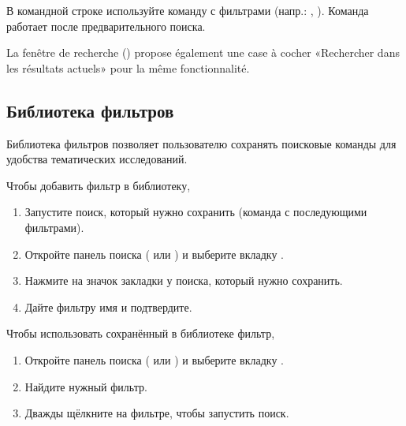 \documentclass[letterpaper,10pt,russian]{sphinxmanual}
\begin{document}
\sphinxAtStartPar
В командной строке используйте команду  с фильтрами (напр.: , ). Команда  работает после предварительного поиска.

\sphinxAtStartPar
La fenêtre de recherche () propose également une case à cocher
«Rechercher dans les résultats actuels» pour la même fonctionnalité.


\subsection{Библиотека фильтров}
\label{\detokenize{annexe_filtres:bibliotheque-de-filtres}}
\sphinxAtStartPar
Библиотека фильтров позволяет пользователю сохранять поисковые команды для удобства тематических исследований.

\sphinxAtStartPar
Чтобы добавить фильтр в библиотеку,
\begin{enumerate}
%
\item {} 
\sphinxAtStartPar
Запустите поиск, который нужно сохранить (команда  с последующими фильтрами).

\item {} 
\sphinxAtStartPar
Откройте панель поиска ( или ) и выберите вкладку .

\item {} 
\sphinxAtStartPar
Нажмите на значок закладки у поиска, который нужно сохранить.

\item {} 
\sphinxAtStartPar
Дайте фильтру имя и подтвердите.

\end{enumerate}

\sphinxAtStartPar
Чтобы использовать сохранённый в библиотеке фильтр,
\begin{enumerate}
%
\item {} 
\sphinxAtStartPar
Откройте панель поиска ( или ) и выберите вкладку .

\item {} 
\sphinxAtStartPar
Найдите нужный фильтр.

\item {} 
\sphinxAtStartPar
Дважды щёлкните на фильтре, чтобы запустить поиск.

\end{enumerate}
\end{document}

